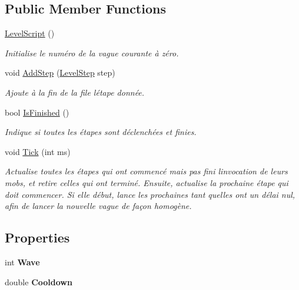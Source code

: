 \subsection*{Public Member Functions}
\begin{DoxyCompactItemize}
\item 
\hyperlink{class_tentacle_slicers_1_1levels_1_1_level_script_a7618d5285222ca9e8a9bb84a9f58383d}{Level\+Script} ()
\begin{DoxyCompactList}\small\item\em Initialise le numéro de la vague courante à zéro. \end{DoxyCompactList}\item 
void \hyperlink{class_tentacle_slicers_1_1levels_1_1_level_script_ab14cf8eb6a0953e29f31bab2af9ab4ad}{Add\+Step} (\hyperlink{class_tentacle_slicers_1_1levels_1_1_level_step}{Level\+Step} step)
\begin{DoxyCompactList}\small\item\em Ajoute à la fin de la file l\textquotesingle{}étape donnée. \end{DoxyCompactList}\item 
bool \hyperlink{class_tentacle_slicers_1_1levels_1_1_level_script_a7b9f11e8df73abbaedcb531aa8e4b1f7}{Is\+Finished} ()
\begin{DoxyCompactList}\small\item\em Indique si toutes les étapes sont déclenchées et finies. \end{DoxyCompactList}\item 
void \hyperlink{class_tentacle_slicers_1_1levels_1_1_level_script_a93a9edee66308c30511184e4328b30b5}{Tick} (int ms)
\begin{DoxyCompactList}\small\item\em Actualise toutes les étapes qui ont commencé mais pas fini l\textquotesingle{}invocation de leurs mobs, et retire celles qui ont terminé. Ensuite, actualise la prochaine étape qui doit commencer. Si elle début, lance les prochaines tant qu\textquotesingle{}elles ont un délai nul, afin de lancer la nouvelle vague de façon homogène. \end{DoxyCompactList}\end{DoxyCompactItemize}
\subsection*{Properties}
\begin{DoxyCompactItemize}
\item 
\mbox{\label{class_tentacle_slicers_1_1levels_1_1_level_script_a08ece69d1ada1cbcea0fe2679db892a7}} 
int {\bfseries Wave}
\item 
\mbox{\label{class_tentacle_slicers_1_1levels_1_1_level_script_a534a3062136738f892ec0052b709584c}} 
double {\bfseries Cooldown}
\end{DoxyCompactItemize}


